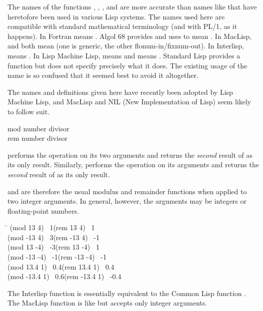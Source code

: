 \begin{defun}[Function]
\beforenoterule
\begin{incompatibility}
The names of the functions , ,
, and  are more accurate than names like 
that have heretofore been used in various Lisp systems.
The names used here are compatible with standard mathematical
terminology (and with PL/1, as it happens).  In Fortran
 means .  Algol 68 provides 
and uses  to mean .
In MacLisp,  and  both
mean  (one is generic, the other flonum-in/fixnum-out).
In Interlisp,  means .
In Lisp Machine Lisp,  means  and  means .
Standard Lisp provides a  function but does not
specify precisely what it does.  The existing usage
of the name  is so confused that it seemed best to avoid it
altogether.

The names and definitions given here have recently been adopted
by Lisp Machine Lisp, and MacLisp and NIL (New Implementation of Lisp) seem likely to follow suit.
\end{incompatibility}
\afternoterule
\end{defun}

\begin{defun}[Function]
mod number divisor \\
rem number divisor

 performs the operation  on its two arguments
and returns the {\it second} result of  as its only result.
Similarly,
 performs the operation  on its arguments
and returns the {\it second} result of  as its only result.

 and  are therefore the usual modulus
and remainder functions when applied to two integer arguments.
In general, however, the arguments may be integers or floating-point
numbers.
\begin{lisp}
\textwidth\=\kill
(mod 13 4) \EV\ 1\>(rem 13 4) \EV\ 1 \\
(mod -13 4) \EV\ 3\>(rem -13 4) \EV\ -1 \\
(mod 13 -4) \EV\ -3\>(rem 13 -4) \EV\ 1 \\
(mod -13 -4) \EV\ -1\>(rem -13 -4) \EV\ -1 \\
(mod 13.4 1) \EV\ 0.4\>(rem 13.4 1) \EV\ 0.4 \\
(mod -13.4 1) \EV\ 0.6\>(rem -13.4 1) \EV\ -0.4
\end{lisp}

\beforenoterule
\begin{incompatibility}
The Interlisp function  is essentially
equivalent to the Common Lisp function .  The MacLisp function 
is like  but accepts only integer arguments.
\end{incompatibility}
\afternoterule
\end{defun}

